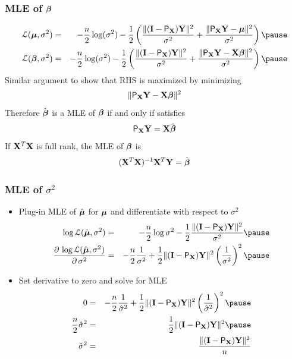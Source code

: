 \documentclass{beamer}
\begin{document}
\begin{frame}
  \frametitle{MLE of $\boldsymbol{\beta}$}
  \begin{eqnarray*}
   \cL(\mub, \sigma^2)  & = & -\frac{n}{2} \log(\sigma^2)  - \frac 1 2 \left( \frac{\|(\I - \P_\X)
  \Y \|^2}{\sigma^2} + \frac{\| \P_\X \Y - \mub\|^2 } {\sigma^2} \right)  \pause \\ 
 \cL(\b, \sigma^2 ) & = & -\frac{n}{2} \log(\sigma^2)  - \frac 1 2 \left( \frac{\|(\I - \P_\X)
  \Y \|^2}{\sigma^2} + \frac{\| \P_\X \Y - \X\b\|^2 } {\sigma^2}
\right)  \pause   
\end{eqnarray*}
Similar argument to show that RHS is maximized by minimizing $$\| \textsf{P}_{\mathbf{X}}
\mathbf{Y} - \mathbf{X}\boldsymbol{\beta}\|^2$$ \pause
Therefore $\hat{\boldsymbol{\beta}}$ is  a MLE of $\boldsymbol{\beta}$ if and only if satisfies 
$$ \textsf{P}_{\mathbf{X}} \mathbf{Y} = \mathbf{X} \hat{\boldsymbol{\beta}}$$ \pause 
If $\mathbf{X}^T\mathbf{X}$ is full rank, the MLE of $\boldsymbol{\beta}$ is $$(\mathbf{X}^T\mathbf{X})^{-1}\mathbf{X}^T\mathbf{Y} = \hat{\boldsymbol{\beta}}$$ 
\end{frame}

\begin{frame}
  \frametitle{MLE of $\sigma^2$}
  \begin{itemize}
  \item Plug-in MLE of $\hat{\boldsymbol{\mu}}$ for $\boldsymbol{\mu}$ and differentiate  with
    respect to $\sigma^2$ \pause
    \begin{eqnarray*}
 \log \cL(\muhat, \sigma^2) & = &  -\frac{n}{2} \log \sigma^2 - \frac 1 2
\frac{\| (\I - \P_\X) \Y \|^2  }{\sigma^2}   \pause \\
\frac{\partial \, \log \cL(\muhat, \sigma^2)}{\partial \, \sigma^2} &
= &  -\frac{n}{2} \frac{1}{\sigma^2}  +  \frac 1 2
\| (\I - \P_\X) \Y \|^2 \left(\frac{1}{\sigma^2}\right)^2 \pause
    \end{eqnarray*}
\item Set derivative to zero and solve for MLE
  \begin{eqnarray*}
0 & = &  -\frac{n}{2} \frac{1}{\shat}  +  \frac 1 2
\| (\I - \P_\X) \Y \|^2 \left(\frac{1}{\shat}\right)^2 \pause \\
\frac{n}{2} \shat & = & \frac 1 2
\| (\I - \P_\X) \Y \|^2 \pause \\
\shat & = & \frac{\| (\I - \P_\X) \Y \|^2}{n}
  \end{eqnarray*}
  \end{itemize}
\end{frame}
\end{document}
